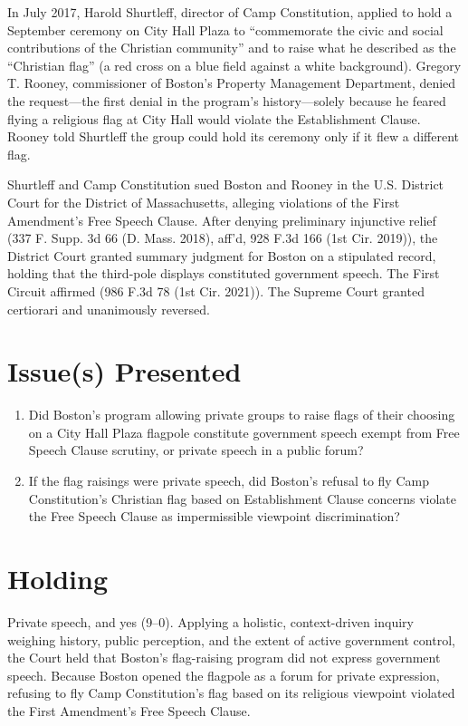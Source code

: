 \documentclass[12pt]{article}
\begin{document}
In July 2017, Harold Shurtleff, director of Camp Constitution, applied to hold a September ceremony on City Hall Plaza to ``commemorate the civic and social contributions of the Christian community'' and to raise what he described as the ``Christian flag'' (a red cross on a blue field against a white background). Gregory T. Rooney, commissioner of Boston's Property Management Department, denied the request---the first denial in the program's history---solely because he feared flying a religious flag at City Hall would violate the Establishment Clause. Rooney told Shurtleff the group could hold its ceremony only if it flew a different flag.

Shurtleff and Camp Constitution sued Boston and Rooney in the U.S. District Court for the District of Massachusetts, alleging violations of the First Amendment's Free Speech Clause. After denying preliminary injunctive relief (337 F. Supp. 3d 66 (D. Mass. 2018), aff'd, 928 F.3d 166 (1st Cir. 2019)), the District Court granted summary judgment for Boston on a stipulated record, holding that the third-pole displays constituted government speech. The First Circuit affirmed (986 F.3d 78 (1st Cir. 2021)). The Supreme Court granted certiorari and unanimously reversed.

\section{Issue(s) Presented}
\begin{enumerate}
  \item Did Boston's program allowing private groups to raise flags of their choosing on a City Hall Plaza flagpole constitute government speech exempt from Free Speech Clause scrutiny, or private speech in a public forum?
  \item If the flag raisings were private speech, did Boston's refusal to fly Camp Constitution's Christian flag based on Establishment Clause concerns violate the Free Speech Clause as impermissible viewpoint discrimination?
\end{enumerate}

\section{Holding}
Private speech, and yes (9--0). Applying a holistic, context-driven inquiry weighing history, public perception, and the extent of active government control, the Court held that Boston's flag-raising program did not express government speech. Because Boston opened the flagpole as a forum for private expression, refusing to fly Camp Constitution's flag based on its religious viewpoint violated the First Amendment's Free Speech Clause.
\end{document}

